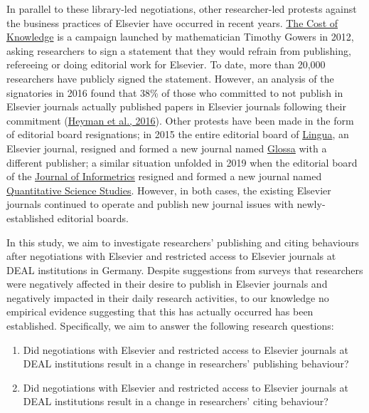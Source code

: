 \documentclass[
]{article}
\providecommand{\tightlist}{%
  \setlength{\itemsep}{0pt}\setlength{\parskip}{0pt}}
\begin{document}
In parallel to these library-led negotiations, other researcher-led protests against the business practices of Elsevier have occurred in recent years. \href{http://thecostofknowledge.com/}{The Cost of Knowledge} is a campaign launched by mathematician Timothy Gowers in 2012, asking researchers to sign a statement that they would refrain from publishing, refereeing or doing editorial work for Elsevier. To date, more than 20,000 researchers have publicly signed the statement. However, an analysis of the signatories in 2016 found that 38\% of those who committed to not publish in Elsevier journals actually published papers in Elsevier journals following their commitment (\href{https://doi.org/10.3389/frma.2016.00007}{Heyman et al., 2016}). Other protests have been made in the form of editorial board resignations; in 2015 the entire editorial board of \href{https://www.journals.elsevier.com/lingua}{Lingua}, an Elsevier journal, resigned and formed a new journal named \href{https://www.glossa-journal.org/}{Glossa} with a different publisher; a similar situation unfolded in 2019 when the editorial board of the \href{https://www.journals.elsevier.com/journal-of-informetrics}{Journal of Informetrics} resigned and formed a new journal named \href{https://direct.mit.edu/qss}{Quantitative Science Studies}. However, in both cases, the existing Elsevier journals continued to operate and publish new journal issues with newly-established editorial boards.

In this study, we aim to investigate researchers' publishing and citing behaviours after negotiations with Elsevier and restricted access to Elsevier journals at DEAL institutions in Germany. Despite suggestions from surveys that researchers were negatively affected in their desire to publish in Elsevier journals and negatively impacted in their daily research activities, to our knowledge no empirical evidence suggesting that this has actually occurred has been established. Specifically, we aim to answer the following research questions:

\begin{enumerate}
\def\labelenumi{\arabic{enumi}.}
\tightlist
\item
  Did negotiations with Elsevier and restricted access to Elsevier journals at DEAL institutions result in a change in researchers' publishing behaviour?
\item
  Did negotiations with Elsevier and restricted access to Elsevier journals at DEAL institutions result in a change in researchers' citing behaviour?
\end{enumerate}
\end{document}
